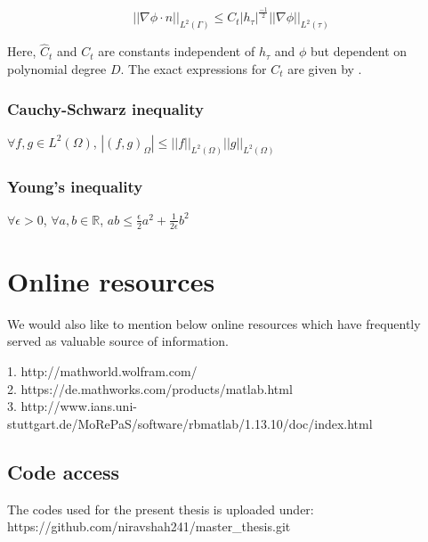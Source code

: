 \documentclass[a4paper]{book}
\begin{document}
\begin{equation}
||\nabla \phi \cdot n||_{L^2(\Gamma)} \leq {C}_t |h_\tau|^{\frac{-1}{2}} ||\nabla \phi||_{L^2(\tau)}
\end{equation}

Here, $\hat{C}_t$ and ${C}_t$ are constants independent of $h_\tau$ and $\phi$ but dependent on polynomial degree $D$. The exact expressions for $C_t$ are given by \cite{warburton}.

\subsection{Cauchy-Schwarz inequality} 
\begin{center}
$\forall f,g \in L^2(\Omega)$, $|(f,g)_{\Omega}| \leq ||f||_{L^2(\Omega)} ||g||_{L^2(\Omega)}$ \\
\end{center}

\subsection{Young's inequality} 
\begin{center}
$\forall \epsilon > 0$, $\forall a,b \in \mathbb{R}$, $ab \leq \frac{\epsilon}{2}a^2 + \frac{1}{2 \epsilon}b^2$\\
\end{center}




\chapter{Online resources}

We would also like to mention below online resources which have frequently served as valuable source of information.\\

\begin{flushleft}
1. http://mathworld.wolfram.com/\\
2. https://de.mathworks.com/products/matlab.html\\
3. http://www.ians.uni-stuttgart.de/MoRePaS/software/rbmatlab/1.13.10/doc/index.html \\
\end{flushleft}

\section{Code access}

The codes used for the present thesis is uploaded under: \\
https://github.com/niravshah241/master\_thesis.git
\end{document}

